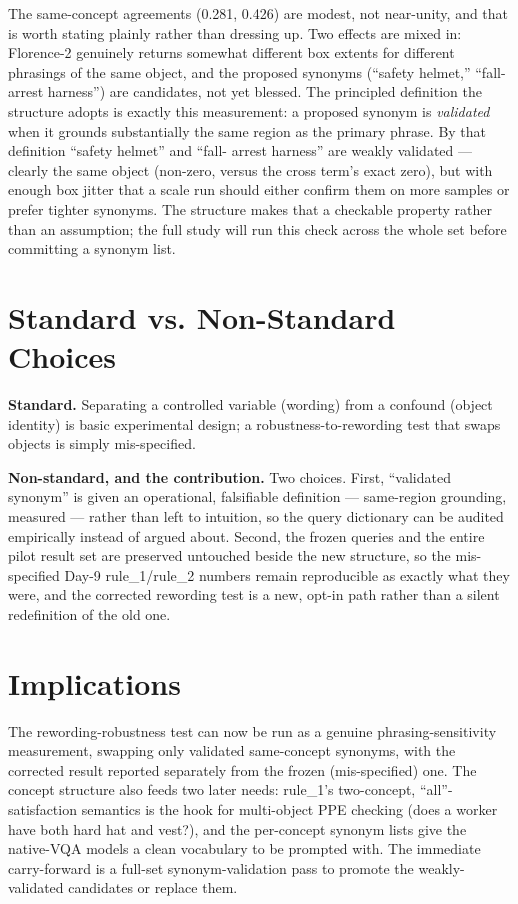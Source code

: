 The same-concept agreements (0.281, 0.426) are modest, not near-unity, and that is worth stating
plainly rather than dressing up. Two effects are mixed in: Florence-2 genuinely returns somewhat
different box extents for different phrasings of the same object, and the proposed synonyms (``safety
helmet,'' ``fall-arrest harness'') are candidates, not yet blessed. The principled definition the
structure adopts is exactly this measurement: a proposed synonym is \emph{validated} when it grounds
substantially the same region as the primary phrase. By that definition ``safety helmet'' and ``fall-
arrest harness'' are weakly validated --- clearly the same object (non-zero, versus the cross term's
exact zero), but with enough box jitter that a scale run should either confirm them on more samples or
prefer tighter synonyms. The structure makes that a checkable property rather than an assumption; the
full study will run this check across the whole set before committing a synonym list.

\section{Standard vs. Non-Standard Choices}

\textbf{Standard.} Separating a controlled variable (wording) from a confound (object identity) is
basic experimental design; a robustness-to-rewording test that swaps objects is simply mis-specified.

\textbf{Non-standard, and the contribution.} Two choices. First, ``validated synonym'' is given an
operational, falsifiable definition --- same-region grounding, measured --- rather than left to
intuition, so the query dictionary can be audited empirically instead of argued about. Second, the
frozen queries and the entire pilot result set are preserved untouched beside the new structure, so the
mis-specified Day-9 rule\_1/rule\_2 numbers remain reproducible as exactly what they were, and the
corrected rewording test is a new, opt-in path rather than a silent redefinition of the old one.

\section{Implications}

The rewording-robustness test can now be run as a genuine phrasing-sensitivity measurement, swapping
only validated same-concept synonyms, with the corrected result reported separately from the frozen
(mis-specified) one. The concept structure also feeds two later needs: rule\_1's two-concept, ``all''-
satisfaction semantics is the hook for multi-object PPE checking (does a worker have both hard hat and
vest?), and the per-concept synonym lists give the native-VQA models a clean vocabulary to be prompted
with. The immediate carry-forward is a full-set synonym-validation pass to promote the weakly-validated
candidates or replace them.
